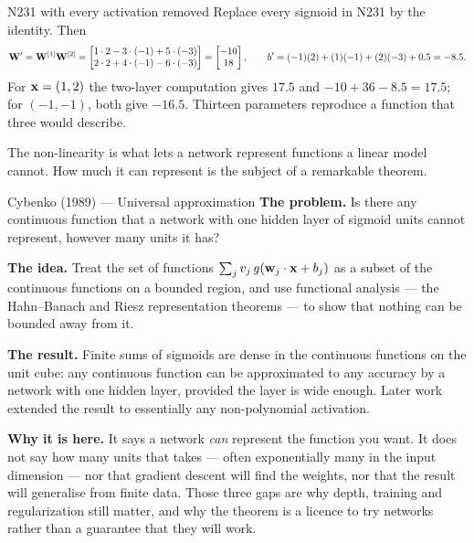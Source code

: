 \begin{workedexample}{N231 with every activation removed}
Replace every sigmoid in N231 by the identity. Then
\[
  \mathbf{W}' = \mathbf{W}^{[1]}\mathbf{W}^{[2]}
    = \begin{bmatrix}1\cdot2 - 3\cdot(-1) + 5\cdot(-3)\\ 2\cdot2 + 4\cdot(-1) - 6\cdot(-3)\end{bmatrix}
    = \begin{bmatrix}-10\\ 18\end{bmatrix},
  \qquad
  b' = (-1)(2) + (1)(-1) + (2)(-3) + 0.5 = -8.5 .
\]
For $\mathbf{x} = (1,2)$ the two-layer computation gives $17.5$ and
$-10 + 36 - 8.5 = 17.5$; for $(-1,-1)$, both give $-16.5$. Thirteen parameters
reproduce a function that three would describe.
\end{workedexample}

The non-linearity is what lets a network represent functions a linear model
cannot. How much it can represent is the subject of a remarkable theorem.

\begin{researchspotlight}{Cybenko (1989) --- Universal approximation}
\textbf{The problem.} Is there any continuous function that a network with one
hidden layer of sigmoid units cannot represent, however many units it has?

\textbf{The idea.} Treat the set of functions
$\sum_{j} v_j\,g(\mathbf{w}_j\cdot\mathbf{x} + b_j)$ as a subset of the continuous
functions on a bounded region, and use functional analysis --- the Hahn--Banach
and Riesz representation theorems --- to show that nothing can be bounded away
from it.

\textbf{The result.} Finite sums of sigmoids are dense in the continuous
functions on the unit cube: any continuous function can be approximated to any
accuracy by a network with one hidden layer, provided the layer is wide enough.
Later work extended the result to essentially any non-polynomial activation.

\textbf{Why it is here.} It says a network \emph{can} represent the function
you want. It does not say how many units that takes --- often exponentially
many in the input dimension --- nor that gradient descent will find the weights,
nor that the result will generalise from finite data. Those three gaps are why
depth, training and regularization still matter, and why the theorem is a
licence to try networks rather than a guarantee that they will work.
\parencite{cybenko1989}
\end{researchspotlight}

